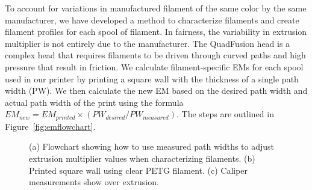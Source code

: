 To account for variations in manufactured filament of the same color by the same manufacturer, we have developed a method to characterize filaments and create filament profiles for each spool of filament. In fairness, the variability in extrusion multiplier is not entirely due to the manufacturer. The QuadFusion head is a complex head that requires filaments to be driven through curved paths and high pressure that result in friction. We calculate filament-specific EMs for each spool used in our printer by printing a square wall with the thickness of a single path width (PW). We then calculate the new EM based on the desired path width and actual path width of the print using the formula $EM_{new} = EM_{printed} \times (PW_{desired}/PW_{measured})$. The steps are outlined in Figure~\ref{fig:emflowchart}.

\begin{figure}
	\begin{center}
	\end{center}
	\caption{(a) Flowchart showing how to use measured path widths to adjust extrusion multiplier values when characterizing filaments. (b) Printed square wall using clear PETG filament. (c) Caliper measurements show over extrusion.} 
	\label{fig:em}
\end{figure} 


